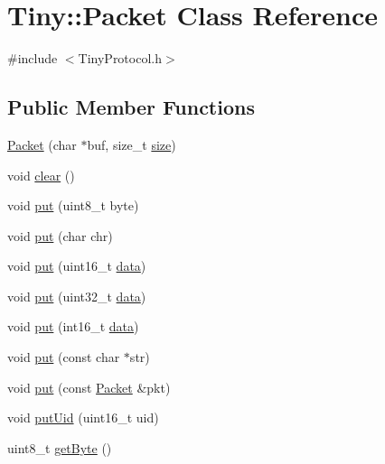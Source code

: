 \hypertarget{classTiny_1_1Packet}{}\section{Tiny\+:\+:Packet Class Reference}
\label{classTiny_1_1Packet}


{\ttfamily \#include $<$Tiny\+Protocol.\+h$>$}

\subsection*{Public Member Functions}
\begin{DoxyCompactItemize}
\item 
\hyperlink{classTiny_1_1Packet_aad47b3053945b29b1b46d76b31b72960}{Packet} (char $\ast$buf, size\+\_\+t \hyperlink{classTiny_1_1Packet_a872f81d4ad35e49b232101c7c12e34f2}{size})
\item 
void \hyperlink{classTiny_1_1Packet_a9bfdb9244515ef3dbf1056c1e37d0902}{clear} ()
\item 
void \hyperlink{classTiny_1_1Packet_a52c746f604ee6c0e4e78902b4cf710a9}{put} (uint8\+\_\+t byte)
\item 
void \hyperlink{classTiny_1_1Packet_a6e1e5236908290f28c3b9a0818242b5b}{put} (char chr)
\item 
void \hyperlink{classTiny_1_1Packet_a0055b5d1c437104e38bf66ece8ab84ba}{put} (uint16\+\_\+t \hyperlink{classTiny_1_1Packet_a3307ba504caba9c5eee8f1f32cf1a749}{data})
\item 
void \hyperlink{classTiny_1_1Packet_aed30fc087142669b37ec99d9d6572e57}{put} (uint32\+\_\+t \hyperlink{classTiny_1_1Packet_a3307ba504caba9c5eee8f1f32cf1a749}{data})
\item 
void \hyperlink{classTiny_1_1Packet_a464ddc51642812e604ac39f775762165}{put} (int16\+\_\+t \hyperlink{classTiny_1_1Packet_a3307ba504caba9c5eee8f1f32cf1a749}{data})
\item 
void \hyperlink{classTiny_1_1Packet_a6b5880ebffa02df3a380a270809433e1}{put} (const char $\ast$str)
\item 
void \hyperlink{classTiny_1_1Packet_a5741e3aec04c9100ce00a6b702417231}{put} (const \hyperlink{classTiny_1_1Packet}{Packet} \&pkt)
\item 
void \hyperlink{classTiny_1_1Packet_ae8764bf70fd6f09df2cb15c02ce2aa30}{put\+Uid} (uint16\+\_\+t uid)
\item 
uint8\+\_\+t \hyperlink{classTiny_1_1Packet_a152feac05d3e972f614c17c36bf30513}{get\+Byte} ()
\item 

\end{DoxyCompactItemize}
